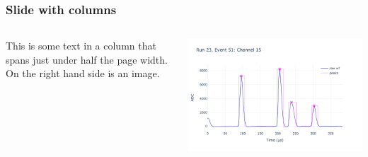 \begin{frame}
	\frametitle{Slide with columns}
	\begin{columns}[T]
    \centering
    \begin{column}{0.48\textwidth}
		  This is some text in a column that spans just under half the page width.
      On the right hand side is an image.
    \end{column}%
    \hfill%
    \begin{column}{0.48\textwidth}
      \includegraphics[width=\textwidth]{figs/logo.png}
    \end{column}

	\end{columns}
\end{frame}